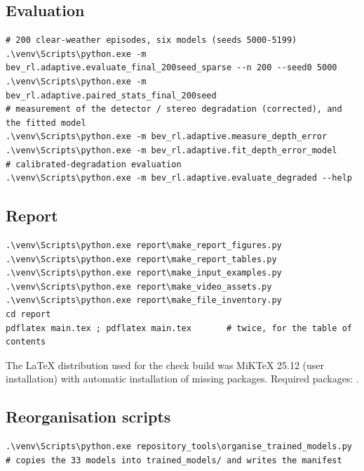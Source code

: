 \subsection{Evaluation}
\begin{lstlisting}
# 200 clear-weather episodes, six models (seeds 5000-5199)
.\venv\Scripts\python.exe -m bev_rl.adaptive.evaluate_final_200seed_sparse --n 200 --seed0 5000
.\venv\Scripts\python.exe -m bev_rl.adaptive.paired_stats_final_200seed
# measurement of the detector / stereo degradation (corrected), and the fitted model
.\venv\Scripts\python.exe -m bev_rl.adaptive.measure_depth_error
.\venv\Scripts\python.exe -m bev_rl.adaptive.fit_depth_error_model
# calibrated-degradation evaluation
.\venv\Scripts\python.exe -m bev_rl.adaptive.evaluate_degraded --help
\end{lstlisting}

\subsection{Report}
\begin{lstlisting}
.\venv\Scripts\python.exe report\make_report_figures.py
.\venv\Scripts\python.exe report\make_report_tables.py
.\venv\Scripts\python.exe report\make_input_examples.py
.\venv\Scripts\python.exe report\make_video_assets.py
.\venv\Scripts\python.exe report\make_file_inventory.py
cd report
pdflatex main.tex ; pdflatex main.tex       # twice, for the table of contents
\end{lstlisting}
The LaTeX distribution used for the check build was MiKTeX 25.12 (user installation) with automatic installation of missing packages.
Required packages: .

\subsection{Reorganisation scripts}
\begin{lstlisting}
.\venv\Scripts\python.exe repository_tools\organise_trained_models.py   # copies the 33 models into trained_models/ and writes the manifest
\end{lstlisting}
